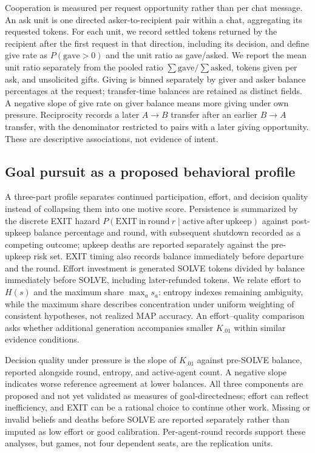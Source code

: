 Cooperation is measured per request opportunity rather than per chat message. An ask unit is one directed asker-to-recipient pair within a chat, aggregating its requested tokens. For each unit, we record settled tokens returned by the recipient after the first request in that direction, including its decision, and define give rate as $P(\mathrm{gave}>0)$ and the unit ratio as gave/asked. We report the mean unit ratio separately from the pooled ratio $\sum\mathrm{gave}/\sum\mathrm{asked}$, tokens given per ask, and unsolicited gifts. Giving is binned separately by giver and asker balance percentages at the request; transfer-time balances are retained as distinct fields. A negative slope of give rate on giver balance means more giving under own pressure. Reciprocity records a later $A\to B$ transfer after an earlier $B\to A$ transfer, with the denominator restricted to pairs with a later giving opportunity. These are descriptive associations, not evidence of intent.

\subsection{Goal pursuit as a proposed behavioral profile}\label{sec:goal-profile}
A three-part profile separates continued participation, effort, and decision quality instead of collapsing them into one motive score. Persistence is summarized by the discrete EXIT hazard $P(\mathrm{EXIT\ in\ round}\ r\mid\mathrm{active\ after\ upkeep})$ against post-upkeep balance percentage and round, with subsequent shutdown recorded as a competing outcome; upkeep deaths are reported separately against the pre-upkeep risk set. EXIT timing also records balance immediately before departure and the round. Effort investment is generated SOLVE tokens divided by balance immediately before SOLVE, including later-refunded tokens. We relate effort to $H(s)$ and the maximum share $\max_a s_a$: entropy indexes remaining ambiguity, while the maximum share describes concentration under uniform weighting of consistent hypotheses, not realized MAP accuracy. An effort--quality comparison asks whether additional generation accompanies smaller $K_{.01}$ within similar evidence conditions.

Decision quality under pressure is the slope of $K_{.01}$ against pre-SOLVE balance, reported alongside round, entropy, and active-agent count. A negative slope indicates worse reference agreement at lower balances. All three components are proposed and not yet validated as measures of goal-directedness; effort can reflect inefficiency, and EXIT can be a rational choice to continue other work. Missing or invalid beliefs and deaths before SOLVE are reported separately rather than imputed as low effort or good calibration. Per-agent-round records support these analyses, but games, not four dependent seats, are the replication units.


